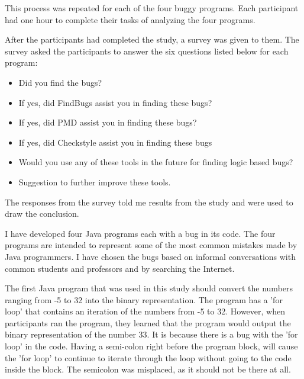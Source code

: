 This process was repeated for each of the four buggy programs. Each participant had one hour to complete their tasks of analyzing the four programs. 

After the participants had completed the study, a survey was given to them. The survey asked the participants to answer the six questions listed below for each program:
\begin{itemize}
	\item Did you find the bugs?
	\item If yes, did FindBugs assist you in finding these bugs?
	\item If yes, did PMD assist you in finding these bugs?
	\item If yes, did Checkstyle assist you in finding these bugs
	\item Would you use any of these tools in the future for finding logic based bugs?
	\item Suggestion to further improve these tools.
\end{itemize}

The responses from the survey told me results from the study and were used to draw the conclusion.   

I have developed four Java programs each with a bug in its code. The four programs are intended to represent some of the most common mistakes made by Java programmers. I have chosen the bugs based on informal conversations with common students and professors and by searching the Internet. 

The first Java program that was used in this study should convert the numbers ranging from -5 to 32 into the binary representation. The program has a 'for loop' that contains an iteration of the numbers from -5 to 32. However, when participants ran the program, they learned that the program would output the binary representation of the number 33. It is because there is a bug with the 'for loop' in the code. Having a semi-colon right before the program block, will cause the 'for loop' to continue to iterate through the loop without going to the code inside the block. The semicolon was misplaced, as it should not be there at all.

